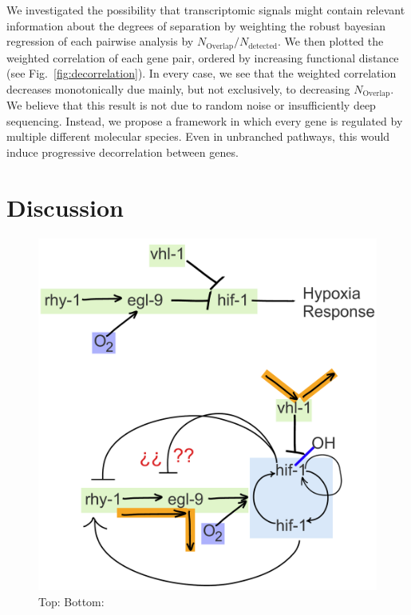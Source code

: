 \documentclass[9pt,twocolumn,twoside]{pnas-new}
\begin{document}
We investigated the possibility that transcriptomic signals might contain relevant information about the degrees of separation by weighting the robust bayesian regression of each pairwise analysis by $N_\mathrm{Overlap}/N_{\mathrm{detected}}$. We then plotted the weighted correlation of each gene pair, ordered by increasing functional distance (see Fig.~\ref{fig:decorrelation}). In every case, we see that the weighted correlation decreases monotonically due mainly, but not exclusively, to decreasing $N_\mathrm{Overlap}$.
We believe that this result is not due to random noise or insufficiently deep sequencing. Instead, we propose a framework in which every gene is regulated by multiple different molecular species. Even in unbranched pathways, this would induce progressive decorrelation between genes.

\section*{Discussion}

\begin{figure}[tbhp]
\centering
\includegraphics[width=.72\linewidth]{figs/new_model.pdf}
\caption{Top:  Bottom: }
\label{fig:newmodel}
\end{figure}




\showmatmethods{}%


\showacknow{} %



\end{document}
